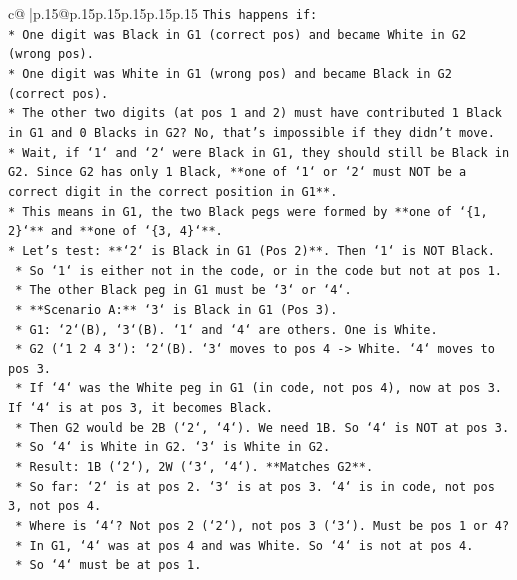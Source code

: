 \documentclass{article}
\begin{document}
{\begin{supertabular}{c@{$\;$}|p{.15\linewidth}@{}p{.15\linewidth}p{.15\linewidth}p{.15\linewidth}p{.15\linewidth}p{.15\linewidth}}
{{{\texttt{This happens if:} \\
\texttt{*   One digit was Black in G1 (correct pos) and became White in G2 (wrong pos).} \\
\texttt{*   One digit was White in G1 (wrong pos) and became Black in G2 (correct pos).} \\
\texttt{*   The other two digits (at pos 1 and 2) must have contributed 1 Black in G1 and 0 Blacks in G2? No, that's impossible if they didn't move.} \\
\texttt{*   Wait, if `1` and `2` were Black in G1, they should still be Black in G2. Since G2 has only 1 Black, **one of `1` or `2` must NOT be a correct digit in the correct position in G1**.} \\
\texttt{*   This means in G1, the two Black pegs were formed by **one of `\{1, 2\}`** and **one of `\{3, 4\}`**.} \\
\texttt{*   Let's test: **`2` is Black in G1 (Pos 2)**. Then `1` is NOT Black.} \\
\texttt{    *   So `1` is either not in the code, or in the code but not at pos 1.} \\
\texttt{    *   The other Black peg in G1 must be `3` or `4`.} \\
\texttt{    *   **Scenario A:** `3` is Black in G1 (Pos 3).} \\
\texttt{        *   G1: `2`(B), `3`(B). `1` and `4` are others. One is White.} \\
\texttt{        *   G2 (`1 2 4 3`): `2`(B). `3` moves to pos 4 {-}> White. `4` moves to pos 3.} \\
\texttt{        *   If `4` was the White peg in G1 (in code, not pos 4), now at pos 3. If `4` is at pos 3, it becomes Black.} \\
\texttt{        *   Then G2 would be 2B (`2`, `4`). We need 1B. So `4` is NOT at pos 3.} \\
\texttt{        *   So `4` is White in G2. `3` is White in G2.} \\
\texttt{        *   Result: 1B (`2`), 2W (`3`, `4`). **Matches G2**.} \\
\texttt{        *   So far: `2` is at pos 2. `3` is at pos 3. `4` is in code, not pos 3, not pos 4.} \\
\texttt{        *   Where is `4`? Not pos 2 (`2`), not pos 3 (`3`). Must be pos 1 or 4?} \\
\texttt{        *   In G1, `4` was at pos 4 and was White. So `4` is not at pos 4.} \\
\texttt{        *   So `4` must be at pos 1.} \\
}}}
\end{supertabular}}
\end{document}
